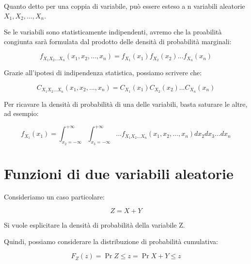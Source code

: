 Quanto detto per una coppia di variabile, può essere esteso a n variabili aleatorie $X_1, X_2, ..., X_n$. \newline 

Se le variabili sono statisticamente indipendenti, avremo che la proabilità congiunta sarà 
formulata dal prodotto delle densità di probabilità marginali: 

{
    \Large
    \begin{equation}
        f_{X_1 X_2 ... X_n } (x_1, x_2, ..., x_n) 
        = 
        f_{X_1}(x_1)
        f_{X_2}(x_2)
        ... 
        f_{X_n}(x_n)    
    \end{equation}
}

Grazie all'ipotesi di indipendenza statistica, possiamo scrivere che: 

{
    \Large 
    \begin{equation}
        C_{X_1 X_2 ... X_n } (x_1, x_2, ..., x_n) 
        = 
        C_{X_1}(x_1)
        C_{X_2}(x_2)
        ... 
        C_{X_n}(x_n)
    \end{equation}
}

Per ricavare la densità di probabilità di una delle variabili, basta saturare le altre, ad esempio: 

{
    \Large 
    \begin{equation}
        f_{X_1} (x_1)
        = 
        \int_{x_2 = -\infty}^{+ \infty}
        \int_{x_3 = -\infty}^{+ \infty}
        ... 
        f_{X_1 X_2 ... X_n} (x_1, x_2, ..., x_n)
        dx_2 dx_3 ... dx_n
    \end{equation}
}

\newpage 

\section{Funzioni di due variabili aleatorie}

Consideriamo un caso particolare: 

{
    \Large 
    \begin{equation}
        Z = X + Y
    \end{equation}
}

Si vuole esplicitare la densità di probabilità della variabile Z. \newline 

Quindi, possiamo considerare la distribuzione di probabilità cumulativa:

{
    \Large 
    \begin{equation}
        F_Z (z) = \Pr{Z \leq z} = \Pr{X+Y \leq z}
    \end{equation}
}

